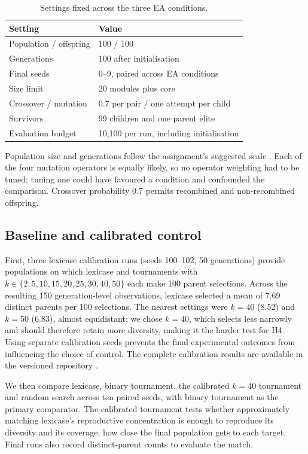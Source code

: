 \documentclass[sigconf]{acmart}
\begin{document}
\begin{table}[t]
\caption{Settings fixed across the three EA conditions.}
\label{tab:settings}
\centering
\begin{tabularx}{\columnwidth}{@{}lX@{}}
\toprule
Setting & Value \\
\midrule
Population / offspring & 100 / 100 \\
Generations & 100 after initialisation \\
Final seeds & 0--9, paired across EA conditions \\
Size limit & 20 modules plus core \\
Crossover / mutation & 0.7 per pair / one attempt per child \\
Survivors & 99 children and one parent elite \\
Evaluation budget & 10,100 per run, including initialisation \\
\bottomrule
\end{tabularx}
\end{table}

Population size and generations follow the assignment's suggested scale \cite{assignment2026}. Each of the four mutation operators is equally likely, so no operator weighting had to be tuned; tuning one could have favoured a condition and confounded the comparison. Crossover probability 0.7 permits recombined and non-recombined offspring.

\subsection{Baseline and calibrated control}
\label{sec:baseline}

First, three lexicase calibration runs
(seeds 100--102, 50 generations) provide populations on which lexicase
and tournaments with
$k\in\{2,5,10,15,20,25,30,40,50\}$ each make 100 parent selections.
Across the resulting 150 generation-level observations, lexicase
selected a mean of 7.69 distinct parents per 100 selections. The nearest settings were $k=40$ (8.52) and $k=50$ (6.83), almost
equidistant; we chose $k=40$, which selects less
narrowly and should therefore retain more diversity, making it the harder
test for H4. Using separate calibration seeds
prevents the final experimental outcomes from influencing the choice of
control. The complete calibration results are available in the
versioned repository \cite{group44}.

We then compare lexicase, binary tournament, the calibrated $k=40$
tournament and random search across ten paired seeds, with binary
tournament as the primary comparator. The calibrated tournament tests
whether approximately matching lexicase's reproductive concentration is
enough to reproduce its diversity and its coverage, how close the final
population gets to each target. Final runs also record
distinct-parent counts to evaluate the match.
\end{document}
